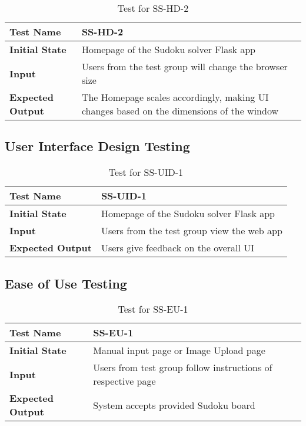\documentclass[11pt]{article}
\begin{document}
\begin{table}[H]
\centering
\begin{tabularx}{\textwidth}{p{5cm}X}
\hline
\textbf{Test Name}       &  SS-HD-2\\ \hline
\textbf{Initial State}   &  Homepage of the Sudoku solver Flask app\\ \hline
\textbf{Input}           &  Users from the test group will change the browser size\\ \hline
\textbf{Expected Output} &  The Homepage scales accordingly, making UI changes based on the dimensions of the window\\ \hline
\end{tabularx}
\caption{Test for SS-HD-2}
\end{table}

\subsection{User Interface Design Testing}
\begin{table}[H]
\centering
\begin{tabularx}{\textwidth}{p{5cm}X}
\hline
\textbf{Test Name}       &  SS-UID-1\\ \hline
\textbf{Initial State}   &  Homepage of the Sudoku solver Flask app\\ \hline
\textbf{Input}           &  Users from the test group view the web app\\ \hline
\textbf{Expected Output} &  Users give feedback on the overall UI\\ \hline
\end{tabularx}
\caption{Test for SS-UID-1}
\end{table}

\subsection{Ease of Use Testing}
\begin{table}[H]
\centering
\begin{tabularx}{\textwidth}{p{5cm}X}
\hline
\textbf{Test Name}       &  SS-EU-1\\ \hline
\textbf{Initial State}   &  Manual input page or Image Upload page\\ \hline
\textbf{Input}           &  Users from test group follow instructions of respective page\\ \hline
\textbf{Expected Output} &  System accepts provided Sudoku board\\ \hline
\end{tabularx}
\caption{Test for SS-EU-1}
\end{table}
\end{document}

